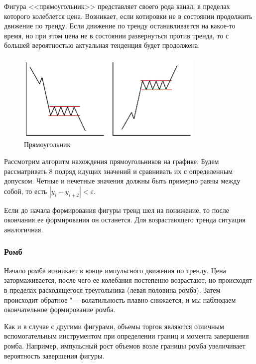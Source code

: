 \documentclass[bachelor, och, coursework]{SCWorks}
\begin{document}
    Фигура <<прямоугольник>> представляет своего рода канал, в пределах которого
    колеблется цена. Возникает, если котировки не в состоянии продолжить
    движение по тренду. Если движение по тренду останавливается на какое-то
    время, но при этом цена не в состоянии развернуться против тренда, то с
    большей вероятностью актуальная тенденция будет продолжена.

    \begin{figure}[H]
        \centering
        \includegraphics[width=0.8\textwidth]{pic/rectangles.jpg}
        \caption{Прямоугольник}
    \end{figure}

    Рассмотрим алгоритм нахождения прямоугольников на графике. Будем
    рассматривать 8 подряд идущих значений и сравнивать их с определенным
    допуском. Четные и нечетные значения должны быть примерно равны между собой,
    то есть $|y_i - y_{i + 2}|<\varepsilon$.
    
    Если до начала формирования фигуры тренд шел на понижение, то после
    окончания ее формирования он останется. Для возрастающего тренда ситуация
    аналогичная.

    \subsubsection{Ромб}

    Начало ромба возникает в конце импульсного движения по тренду. Цена
    затормаживается, после чего ее колебания постепенно возрастают, но
    происходят в пределах расходящегося треугольника (левая половина ромба).
    Затем происходит обратное "--- волатильность плавно снижается, и мы
    наблюдаем окончательное формирование ромба.

    Как и в случае с другими фигурами, объемы торгов являются отличным
    вспомогательным инструментом при определении границ и момента завершения
    ромба. Например, импульсный рост объемов возле границы ромба увеличивает
    вероятность завершения фигуры.
\end{document}
